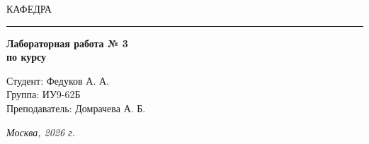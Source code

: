\begin{titlepage}
  \vspace{0.5ex}
  \hspace{-35pt} \noindent \small КАФЕДРА\hspace{50pt} 

  \vspace*{-16pt}
  \hspace{30pt}\rule{0.866\textwidth}{0.4pt}

  \vspace{11em}

  \begin{center}
    \Large {\bf Лабораторная работа № 3} \\
    \large {\bf по курсу } \\
    \large {}

  \end{center}\normalsize

  \vspace{8em}

  \begin{flushright}
    \begin{minipage}{0.5\linewidth}
      {Студент: Федуков А. А. \hspace*{15pt}\\
        Группа: ИУ9-62Б \\
        Преподаватель: Домрачева А. Б.\hspace*{15pt}}
    \end{minipage}
  \end{flushright}
  \bigskip
  \vfill

  \begin{center}
    \textsl{Москва, 2026 г.}
  \end{center}
\end{titlepage}
